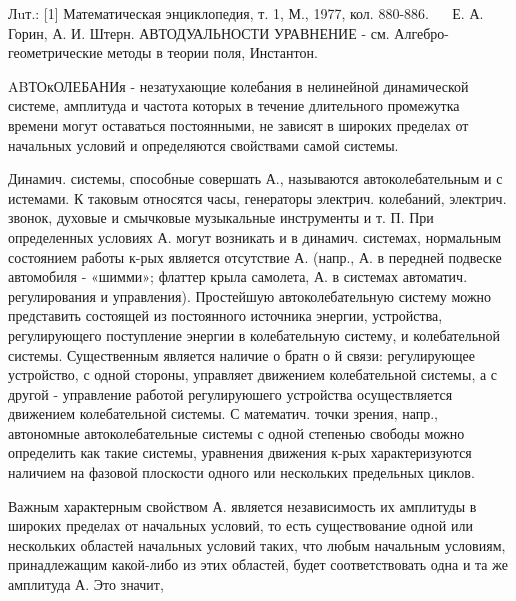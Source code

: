 \documentclass[10pt]{article}
\begin{document}
Лuт.: [1] Математическая энциклопедия, т. 1, М., 1977, кол. 880-886. $\quad$ Е. А. Горин, А. И. Штерн. АВТОДУАЛЬНОСТИ УРАВНЕНИЕ - см. Алгебро-геометрические методы в теории поля, Инстантон.



ABТОкОЛЕБАНИя - незатухающие колебания в нелинейной динамической системе, амплитуда и частота которых в течение длительного промежутка времени могут оставаться постоянными, не зависят в широких пределах от начальных условий и определяются свойствами самой системы.



Динамич. системы, способные совершать А., называются автоколебательным и с истемами. К таковым относятся часы, генераторы электрич. колебаний, электрич. звонок, духовые и смычковые музыкальные инструменты и т. П. При определенных условиях А. могут возникать и в динамич. системах, нормальным состоянием работы к-рых является отсутствие А. (напр., А. в передней подвеске автомобиля - «шимми»; флаттер крыла самолета, А. в системах автоматич. регулирования и управления). Простейшую автоколебательную систему можно представить состоящей из постоянного источника энергии, устройства, регулирующего поступление энергии в колебательную систему, и колебательной системы. Существенным является наличие о братн о й связи: регулирующее устройство, с одной стороны, управляет движением колебательной системы, а с другой - управление работой регулируюшего устройства осуществляется движением колебательной системы. С математич. точки зрения, напр., автономные автоколебательные системы с одной степенью свободы можно определить как такие системы, уравнения движения к-рых характеризуются наличием на фазовой плоскости одного или нескольких предельных циклов.



Важным характерным свойством А. является независимость их амплитуды в широких пределах от начальных условий, то есть существование одной или нескольких областей начальных условий таких, что любым начальным условиям, принадлежащим какой-либо из этих областей, будет соответствовать одна и та же амплитуда А. Это значит,
\end{document}
